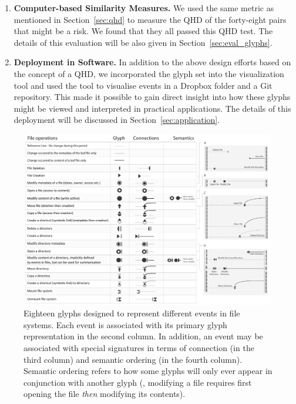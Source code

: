 \begin{enumerate}
\item\textbf{Computer-based Similarity Measures.} We used the same metric as mentioned in Section~\ref{sec:qhd} to measure the QHD of the forty-eight pairs that might be a risk.
We found that they all passed this QHD test.
The details of this evaluation will be also given in Section~\ref{sec:eval_glyphs}.

\item\textbf{Deployment in Software.} In addition to the above design efforts based on the concept of a QHD, we incorporated the glyph set into the visualization tool and used the tool to visualise events in a Dropbox folder and a Git repository.
This made it possible to gain direct insight into how these glyphs might be viewed and interpreted in practical applications.
The details of this deployment will be discussed in Section~\ref{sec:application}.
\end{enumerate}

\begin{figure}[t!]
\begin{center}
\includegraphics[width=0.99\textwidth]{images/filesystem/table_new}
\end{center}
\caption{Eighteen glyphs designed to represent different events in file systems.
Each event is associated with its primary glyph representation in the second column.
In addition, an event may be associated with special signatures in terms of connection (in the third column) and semantic ordering (in the fourth column).
Semantic ordering refers to how some glyphs will only ever appear in conjunction with another glyph (\eg, modifying a file requires first opening the file \emph{then} modifying its contents).}
\label{table:fileoperations}
\end{figure}

